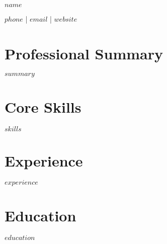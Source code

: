 \documentclass[11pt,a4paper]{article}
\begin{document}
\pagestyle{empty}

{\Huge\bfseries\color{primarycolor} $name$}

\vspace{0.5em}
{\large $phone$ | $email$ | $website$}

\vspace{1em}
\section{Professional Summary}
$summary$

\section{Core Skills}
$skills$

\section{Experience}
$experience$

\section{Education}
$education$
\end{document}
